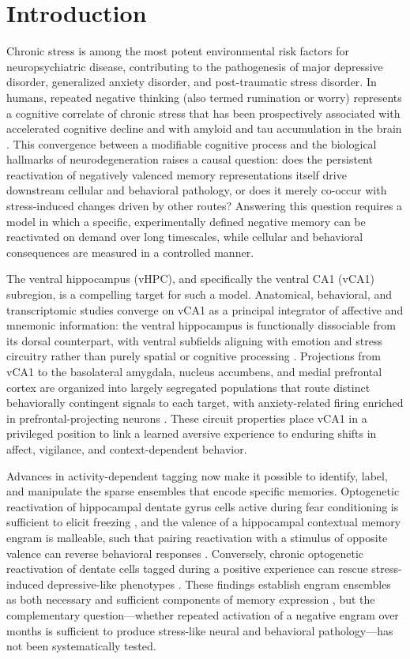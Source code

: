 \section{Introduction}

Chronic stress is among the most potent environmental risk factors for neuropsychiatric disease, contributing to the pathogenesis of major depressive disorder, generalized anxiety disorder, and post-traumatic stress disorder. In humans, repeated negative thinking (also termed rumination or worry) represents a cognitive correlate of chronic stress that has been prospectively associated with accelerated cognitive decline and with amyloid and tau accumulation in the brain \cite{marchant2020rnt}. This convergence between a modifiable cognitive process and the biological hallmarks of neurodegeneration raises a causal question: does the persistent reactivation of negatively valenced memory representations itself drive downstream cellular and behavioral pathology, or does it merely co-occur with stress-induced changes driven by other routes? Answering this question requires a model in which a specific, experimentally defined negative memory can be reactivated on demand over long timescales, while cellular and behavioral consequences are measured in a controlled manner.

The ventral hippocampus (vHPC), and specifically the ventral CA1 (vCA1) subregion, is a compelling target for such a model. Anatomical, behavioral, and transcriptomic studies converge on vCA1 as a principal integrator of affective and mnemonic information: the ventral hippocampus is functionally dissociable from its dorsal counterpart, with ventral subfields aligning with emotion and stress circuitry rather than purely spatial or cognitive processing \cite{fanselow2010ventral}. Projections from vCA1 to the basolateral amygdala, nucleus accumbens, and medial prefrontal cortex are organized into largely segregated populations that route distinct behaviorally contingent signals to each target, with anxiety-related firing enriched in prefrontal-projecting neurons \cite{ciocchi2015vca1}. These circuit properties place vCA1 in a privileged position to link a learned aversive experience to enduring shifts in affect, vigilance, and context-dependent behavior.

Advances in activity-dependent tagging now make it possible to identify, label, and manipulate the sparse ensembles that encode specific memories. Optogenetic reactivation of hippocampal dentate gyrus cells active during fear conditioning is sufficient to elicit freezing \cite{liu2012engram}, and the valence of a hippocampal contextual memory engram is malleable, such that pairing reactivation with a stimulus of opposite valence can reverse behavioral responses \cite{redondo2014valence}. Conversely, chronic optogenetic reactivation of dentate cells tagged during a positive experience can rescue stress-induced depressive-like phenotypes \cite{ramirez2015positive}. These findings establish engram ensembles as both necessary and sufficient components of memory expression \cite{josselyn2020engram}, but the complementary question---whether repeated activation of a negative engram over months is sufficient to produce stress-like neural and behavioral pathology---has not been systematically tested.

